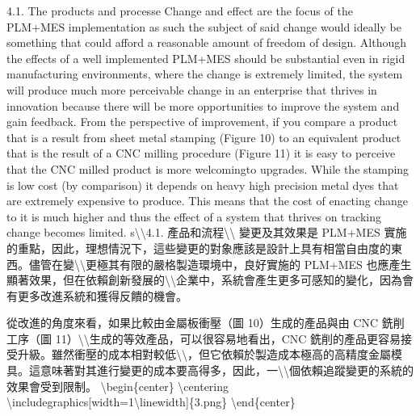 4.1. The products and processe Change and effect are the focus of the
PLM+MES implementation as such the subject of said change would ideally
be something that could afford a reasonable amount of freedom of design.
Although the effects of a well implemented PLM+MES should be substantial
even in rigid manufacturing environments, where the change is extremely
limited, the system will produce much more perceivable change in an
enterprise that thrives in innovation because there will be more
opportunities to improve the system and gain feedback. From the
perspective of improvement, if you compare a product that is a result
from sheet metal stamping (Figure 10) to an equivalent product that is
the result of a CNC milling procedure (Figure 11) it is easy to perceive
that the CNC milled product is more welcomingto upgrades. While the
stamping is low cost (by comparison) it depends on heavy high precision
metal dyes that are extremely expensive to produce. This means that the
cost of enacting change to it is much higher and thus the effect of a
system that thrives on tracking change becomes limited.
s\textbackslash\textbackslash4.1.
產品和流程\textbackslash\textbackslash{} 變更及其效果是 PLM+MES
實施的重點，因此，理想情況下，這些變更的對象應該是設計上具有相當自由度的東西。儘管在變\textbackslash\textbackslash 更極其有限的嚴格製造環境中，良好實施的
PLM+MES
也應產生顯著效果，但在依賴創新發展的\textbackslash\textbackslash 企業中，系統會產生更多可感知的變化，因為會有更多改進系統和獲得反饋的機會。

從改進的角度來看，如果比較由金屬板衝壓（圖 10）生成的產品與由 CNC
銑削工序（圖
11）\textbackslash\textbackslash 生成的等效產品，可以很容易地看出，CNC
銑削的產品更容易接受升級。雖然衝壓的成本相對較低\textbackslash\textbackslash，但它依賴於製造成本極高的高精度金屬模具。這意味著對其進行變更的成本要高得多，因此，一\textbackslash\textbackslash 個依賴追蹤變更的系統的效果會受到限制。
\textbackslash begin\{center\} \textbackslash centering
\textbackslash includegraphics{[}width=1\textbackslash linewidth{]}\{3.png\}
\textbackslash end\{center\}

